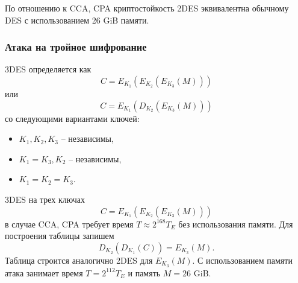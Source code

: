 По отношению к CCA, CPA криптостойкость 2DES эквивалентна обычному DES с использованием 26 GiB памяти.


\subsubsection{Атака на тройное шифрование}

3DES определяется как
    \[ C = E_{K_1}( E_{K_2}( E_{K_3}( M))) \]
или
    \[ C = E_{K_1}( D_{K_2}( E_{K_3}( M))) \]
со следующими вариантами ключей:
\begin{itemize}
    \item $K_1, K_2, K_3$ -- независимы,
    \item $K_1 = K_3, K_2$ -- независимы,
    \item $K_1 = K_2 = K_3$.
\end{itemize}

3DES на трех ключах
    \[ C = E_{K_1}( E_{K_2}( E_{K_3}( M))) \]
в случае CCA, CPA требует время $T \approx 2^{168} T_E$ без использования памяти. Для построения таблицы запишем
    \[ D_{K_2}( D_{K_1}( C)) = E_{K_3} (M). \]
Таблица строится аналогично 2DES для $E_{K_3}(M)$. С использованием памяти атака занимает время $T = 2^{112} T_E$ и память $M = 26$ GiB.

